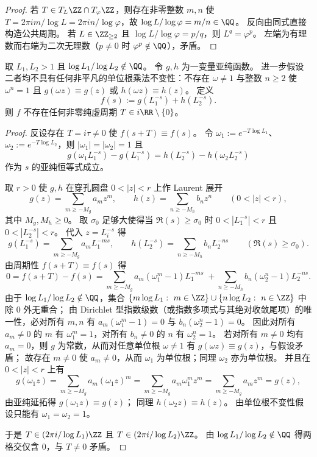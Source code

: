 \begin{proof}
若 \(T\in T_L\ZZ\cap T_\varphi\ZZ\)，则存在非零整数 \(m,n\) 使
\(
T=2\pi i m/\log L=2\pi i n/\log\varphi
\)，故 \(\log L/\log\varphi=m/n\in\QQ\)。
反向由同式直接构造公共周期。
若 \(L\in\ZZ_{\ge2}\) 且 \(\log L/\log\varphi=p/q\)，则 \(L^q=\varphi^p\)。
左端为有理数而右端为二次无理数（\(p\neq 0\) 时 \(\varphi^p\notin\QQ\)），矛盾。
\end{proof}

\begin{theorem}\label{thm:xi-two-base-deperiodization-no-imag-period}
取 \(L_1,L_2>1\) 且 \(\log L_1/\log L_2\notin\QQ\)。
令 \(g,h\) 为一变量亚纯函数。
进一步假设二者均不具有任何非平凡的单位根乘法不变性：不存在 \(\omega\neq 1\) 与整数 \(n\ge 2\) 使 \(\omega^n=1\) 且 \(g(\omega z)\equiv g(z)\) 或 \(h(\omega z)\equiv h(z)\)。
定义
\[
f(s):=g(L_1^{-s})+h(L_2^{-s}).
\]
则 \(f\) 不存在任何非零纯虚周期 \(T\in i\RR\setminus\{0\}\)。
\end{theorem}

\begin{proof}
反设存在 \(T=i\tau\neq 0\) 使 \(f(s+T)\equiv f(s)\)。
令 \(\omega_1:=e^{-T\log L_1}\)、\(\omega_2:=e^{-T\log L_2}\)，则 \(|\omega_1|=|\omega_2|=1\) 且
\[
g(\omega_1 L_1^{-s})-g(L_1^{-s})=h(L_2^{-s})-h(\omega_2 L_2^{-s})
\]
作为 \(s\) 的亚纯恒等式成立。
\par
取 \(r>0\) 使 \(g,h\) 在穿孔圆盘 \(0<|z|<r\) 上作 Laurent 展开
\[
g(z)=\sum_{m\ge -M_g} a_m z^m,\qquad
h(z)=\sum_{n\ge -M_h} b_n z^n
\qquad(0<|z|<r),
\]
其中 \(M_g,M_h\ge 0\)。
取 \(\sigma_0\) 足够大使得当 \(\Re(s)\ge \sigma_0\) 时 \(0<|L_1^{-s}|<r\) 且 \(0<|L_2^{-s}|<r\)。
代入 \(z=L_i^{-s}\) 得
\[
g(L_1^{-s})=\sum_{m\ge -M_g} a_m L_1^{-ms},\qquad
h(L_2^{-s})=\sum_{n\ge -M_h} b_n L_2^{-ns}
\qquad(\Re(s)\ge \sigma_0).
\]
由周期性 \(f(s+T)\equiv f(s)\) 得
\[
0=f(s+T)-f(s)
=\sum_{m\ge -M_g} a_m(\omega_1^m-1)L_1^{-ms}
\;+\sum_{n\ge -M_h} b_n(\omega_2^n-1)L_2^{-ns}.
\]
由于 \(\log L_1/\log L_2\notin\QQ\)，集合 \(\{m\log L_1:\ m\in\ZZ\}\cup\{n\log L_2:\ n\in\ZZ\}\) 中除 \(0\) 外无重合；
由 Dirichlet 型指数级数（或指数多项式与其绝对收敛尾项）的唯一性，必对所有 \(m,n\) 有
\(
a_m(\omega_1^m-1)=0
\) 与
\(
b_n(\omega_2^n-1)=0
\)。
因此对所有 \(a_m\neq 0\) 的 \(m\) 有 \(\omega_1^m=1\)，对所有 \(b_n\neq 0\) 的 \(n\) 有 \(\omega_2^n=1\)。
若对所有 \(m\neq 0\) 均有 \(a_m=0\)，则 \(g\) 为常数，从而对任意单位根 \(\omega\neq 1\) 有 \(g(\omega z)\equiv g(z)\)，与假设矛盾；
故存在 \(m\neq 0\) 使 \(a_m\neq 0\)，从而 \(\omega_1\) 为单位根；同理 \(\omega_2\) 亦为单位根。
并且在 \(0<|z|<r\) 上有
\[
g(\omega_1 z)
=\sum_{m\ge -M_g} a_m(\omega_1 z)^m
=\sum_{m\ge -M_g} a_m\omega_1^m z^m
=\sum_{m\ge -M_g} a_m z^m
=g(z),
\]
由亚纯延拓得 \(g(\omega_1 z)\equiv g(z)\)；
同理 \(h(\omega_2 z)\equiv h(z)\)。
由单位根不变性假设只能有 \(\omega_1=\omega_2=1\)。
\par
于是 \(T\in (2\pi i/\log L_1)\ZZ\) 且 \(T\in (2\pi i/\log L_2)\ZZ\)。
由 \(\log L_1/\log L_2\notin\QQ\) 得两格交仅含 \(0\)，与 \(T\neq 0\) 矛盾。
\end{proof}
